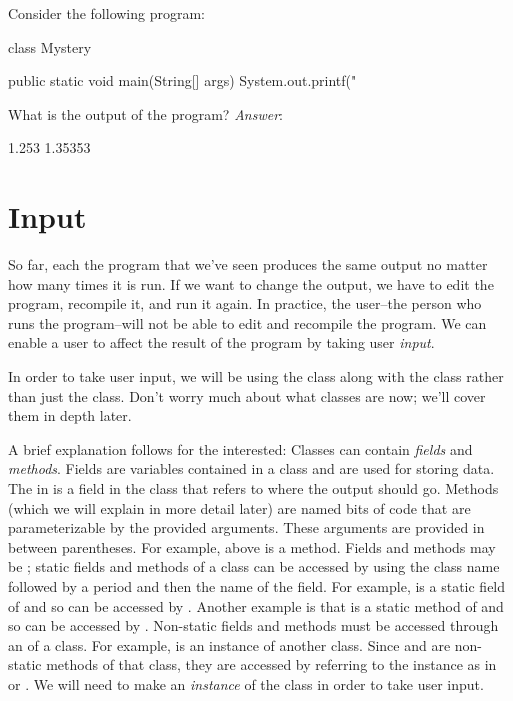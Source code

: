 \begin{example}
Consider the following program:
\begin{code}
class Mystery {

    public static void main(String[] args) {
        System.out.printf("%
    }

}
\end{code}
What is the output of the program?
\noindent \emph{Answer}:
\begin{code}
1.253
1.35353
\end{code}
\end{example}

\section{Input}
So far, each the program that we've seen produces the same output no
matter how many times it is run. If we want to change the output,
we have to edit the program, recompile it, and run it again.
In practice, the user--the person who runs the program--will
not be able to edit and recompile the program.
We can enable a user to affect the result of the program
by taking user \emph{input}.

In order to take user input, we will be using the  class
along with the  class
rather than just the  class.
Don't worry much about what classes are now; we'll cover
them in depth later.

A brief explanation follows for the interested:
Classes can contain \emph{fields} and \emph{methods}.
Fields are variables contained in a class and are used
for storing data. The  in  is
a field in the  class
that refers to where the output should go.
Methods (which we will explain in more detail later) are named bits of code
that are parameterizable by the provided arguments. These
arguments are provided in between parentheses.
For example,  above is a method.
Fields and methods may be ; static fields and methods
of a class can be accessed by using the class name followed
by a period and then the name of the field. For example,
 is a static field of  and 
so can be accessed by .
Another example is that  is a static method
of  and so can be accessed by .
Non-static fields and methods must be accessed
through an  of a class. For example,
 is an instance of another class.
Since  and  are non-static methods
of that class, they are accessed
by referring to the instance  as in
 or .
We will need to make an \emph{instance} of the
 class in order to take user input.

